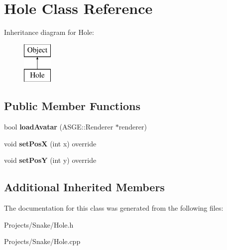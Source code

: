\hypertarget{class_hole}{}\section{Hole Class Reference}
\label{class_hole}
Inheritance diagram for Hole\+:\begin{figure}[H]
\begin{center}
\leavevmode
\includegraphics[height=2.000000cm]{class_hole}
\end{center}
\end{figure}
\subsection*{Public Member Functions}
\begin{DoxyCompactItemize}
\item 
\mbox{\label{class_hole_a6298a06f04d5f9d91392f4134a0c417e}} 
bool {\bfseries load\+Avatar} (A\+S\+G\+E\+::\+Renderer $\ast$renderer)
\item 
\mbox{\label{class_hole_a553f32907e26768b5fa6eddca0af499f}} 
void {\bfseries set\+PosX} (int x) override
\item 
\mbox{\label{class_hole_a7d6f0b55d841be9a4d8c37e07e2f2d70}} 
void {\bfseries set\+PosY} (int y) override
\end{DoxyCompactItemize}
\subsection*{Additional Inherited Members}


The documentation for this class was generated from the following files\+:\begin{DoxyCompactItemize}
\item 
Projects/\+Snake/Hole.\+h\item 
Projects/\+Snake/Hole.\+cpp\end{DoxyCompactItemize}
